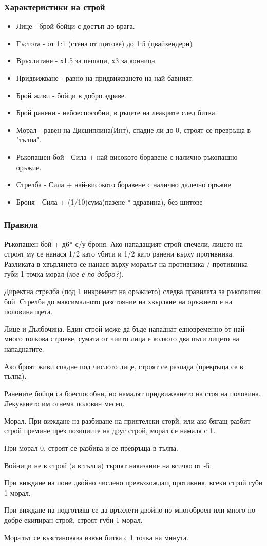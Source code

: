 \subsubsection{Характеристики на строй}
\begin{itemize}
\item{Лице - брой бойци с достъп до врага.}
\item{Гъстота - от 1:1 (стена от щитове) до 1:5 (цвайхендери)}
\item{Връхлитане - х1.5 за пешаци, х3 за конница}
\item{Придвижване - равно на придвижването на най-бавният.}

\item{Брой живи - бойци в добро здраве.}
\item{Брой ранени - небоеспособни, в ръцете на леакрите след битка.}
\item{Морал - равен на Дисциплина(Инт), спадне ли до 0, строят се превръща в "тълпа".}

\item{Ръкопашен бой - Сила + най-високото боравене с налично ръкопашно оръжие.}
\item{Стрелба - Сила + най-високото боравене с налично далечно оръжие}
\item{Броня - Сила + (1/10)сума(пазене * здравина), без щитове}
\end{itemize}
\subsubsection{Правила}
Ръкопашен бой + д6* с/у броня. Ако нападащият строй спечели, лицето на строят му се нанася 1/2 като убити и 1/2 като ранени върху противника. Разликата в хвърлянето се нанася върху моралът на противника / противника губи 1 точка морал (\textit{кое е по-добро?}).

Директна стрелба (под 1 инкремент на оръжието) следва правилата за ръкопашен бой. Стрелба до максималното разстояние на хвърляне на оръжието е на половина щета.

Лице и Дълбочина. Един строй може да бъде нападнат едновременно от най-много толкова строеве, сумата от чиито лица е колкото два пъти лицето на  нападнатите.

Ако броят живи спадне под числото лице, строят се разпада (превръща се в тълпа).

Ранените бойци са боеспособни, но намалят придвижването на стоя на половина. Лекуването им отнема половин месец.

Морал. При виждане на разбиване на приятелски сторй, или ако бягащ разбит строй премине през позициите на друг строй, морал се намаля с 1.

При морал 0, строят се разбива и се превръща в тълпа.

Войници не в строй (а в тълпа) търпят наказание на всичко от -5.

При виждане на поне двойно числено превъзхождащ противник, всеки строй губи 1 морал.

При виждане на подготвящ се да връхлети двойно по-многоброен или много по-добре екипиран строй, строят губи 1 морал.

Моралът се възстановява извън битка с 1 точка на минута.

